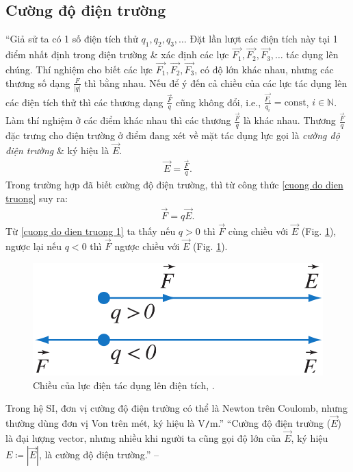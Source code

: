 \documentclass[oneside]{book}
\numberwithin{equation}{section}
\begin{document}
\subsection{Cường độ điện trường}
``Giả sử ta có 1 số điện tích thử $q_1,q_2,q_3,\ldots$ Đặt lần lượt các điện tích này tại 1 điểm nhất định trong điện trường \& xác định các lực $\overrightarrow{F_1},\overrightarrow{F_2},\overrightarrow{F_3},\ldots$ tác dụng lên chúng. Thí nghiệm cho biết các lực $\overrightarrow{F_1},\overrightarrow{F_2},\overrightarrow{F_3}$, có độ lớn khác nhau, nhưng các thương số dạng $\frac{F}{|q|}$ thì bằng nhau. Nếu để ý đến cả chiều của các lực tác dụng lên các điện tích thử thì các thương dạng $\frac{\overrightarrow{F}}{q}$ cũng không đổi, i.e., $\frac{\overrightarrow{F_i}}{q_i} = \mbox{const}$, $i\in\mathbb{N}$. Làm thí nghiệm ở các điểm khác nhau thì các thương $\frac{\overrightarrow{F}}{q}$ là khác nhau. Thương $\frac{\overrightarrow{F}}{q}$ đặc trưng cho điện trường ở điểm đang xét về mặt tác dụng lực gọi là \textit{cường độ điện trường} \& ký hiệu là $\overrightarrow{E}$.
\begin{align}
	\label{cuong do dien truong}
	\boxed{\overrightarrow{E} = \frac{\overrightarrow{F}}{q}.}
\end{align}
Trong trường hợp đã biết cường độ điện trường, thì từ công thức \eqref{cuong do dien truong} suy ra:
\begin{align}
	\label{cuong do dien truong 1}
	\overrightarrow{F} = q\overrightarrow{E}.
\end{align}
Từ \eqref{cuong do dien truong 1} ta thấy nếu $q > 0$ thì $\overrightarrow{F}$ cùng chiều với $\overrightarrow{E}$ (Fig. \ref{fig:chieu_luc_dien}), ngược lại nếu $q < 0$ thì $\overrightarrow{F}$ ngược chiều với $\overrightarrow{E}$ (Fig. \ref{fig:chieu_luc_dien}).

\begin{figure}[H]
	\centering
	\includegraphics[scale=0.15]{chieu_luc_dien}
	\caption{Chiều của lực điện tác dụng lên điện tích, \cite[Hình 3.1, p. 14]{SGK_Vat_Ly_11_nang_cao}.}
	\label{fig:chieu_luc_dien}
\end{figure}
Trong hệ SI, đơn vị cường độ điện trường có thể là Newton trên Coulomb, nhưng thường dùng đơn vị Von trên mét, ký hiệu là V\texttt{/}m.'' ``Cường độ điện trường ($\overrightarrow{E}$) là đại lượng vector, nhưng nhiều khi người ta cũng gọi độ lớn của $\overrightarrow{E}$, ký hiệu $E\coloneqq| \overrightarrow{E}|$, là cường độ điện trường.'' -- \cite[p. 14]{SGK_Vat_Ly_11_nang_cao}
\end{document}
